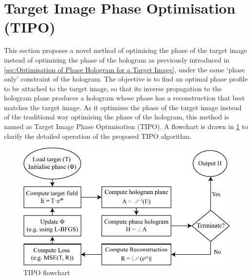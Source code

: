 \newpage
\section{Target Image Phase Optimisation (TIPO)}
This section proposes a novel method of optimising the phase of the target image instead of optimising the phase of the hologram as previously introduced in \cref{sec:Optimisation of Phase Hologram for a Target Image}, under the same `phase only' constraint of the hologram. The objective is to find an optimal phase profile to be attached to the target image, so that its inverse propagation to the hologram plane produces a hologram whose phase has a reconstruction that best matches the target image. As it optimises the phase of the target image instead of the traditional way optimising the phase of the hologram, this method is named as Target Image Phase Optimisation (TIPO). A flowchart is drawn in \cref{fig:TIPO_flowchart} to clarify the detailed operation of the proposed TIPO algorithm.

\begin{figure}[H]
	\centering
	\includegraphics[width=\textwidth]{TIPO_flowchart.pdf}
	\caption{TIPO flowchart}
	\label{fig:TIPO_flowchart}
\end{figure}

